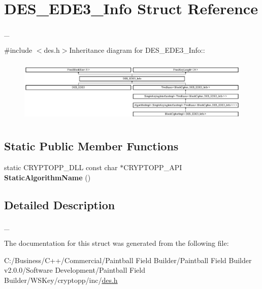 \hypertarget{struct_d_e_s___e_d_e3___info}{
\section{DES\_\-EDE3\_\-Info Struct Reference}
\label{struct_d_e_s___e_d_e3___info}
}


\_\-  


{\ttfamily \#include $<$des.h$>$}Inheritance diagram for DES\_\-EDE3\_\-Info::\begin{figure}[H]
\begin{center}
\leavevmode
\includegraphics[height=3.09963cm]{struct_d_e_s___e_d_e3___info}
\end{center}
\end{figure}
\subsection*{Static Public Member Functions}
\begin{DoxyCompactItemize}
\item 
\hypertarget{struct_d_e_s___e_d_e3___info_a5a96886c77ea91b90b2ddbead181d21f}{
static CRYPTOPP\_\-DLL const char $\ast$CRYPTOPP\_\-API {\bfseries StaticAlgorithmName} ()}
\label{struct_d_e_s___e_d_e3___info_a5a96886c77ea91b90b2ddbead181d21f}

\end{DoxyCompactItemize}


\subsection{Detailed Description}
\_\- 

The documentation for this struct was generated from the following file:\begin{DoxyCompactItemize}
\item 
C:/Business/C++/Commercial/Paintball Field Builder/Paintball Field Builder v2.0.0/Software Development/Paintball Field Builder/WSKey/cryptopp/inc/\hyperlink{des_8h}{des.h}\end{DoxyCompactItemize}
